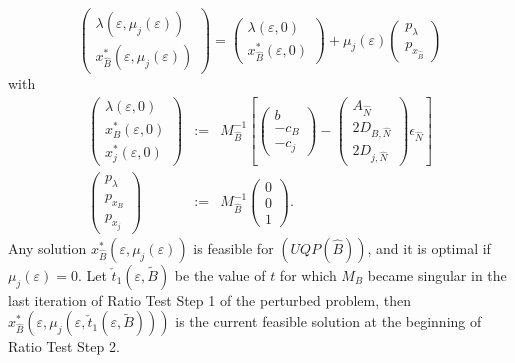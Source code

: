\documentclass[a4paper]{article}
\begin{document}
\begin{equation}
\label{eq:QP_j_mu_opt_short}
\left(\begin{array}{c}
         \lambda\left(\varepsilon, \mu_{j}\left(\varepsilon\right)\right) \\
	 \hline
	 x_{\hat{B}}^{*}\left(\varepsilon, 
	   \mu_{j}\left(\varepsilon\right)\right)
       \end{array}
\right)
=
\left(\begin{array}{c}
        \lambda\left(\varepsilon, 0\right) \\
	\hline
	x_{\hat{B}}^{*}\left(\varepsilon, 0\right)
       \end{array}
\right)
+ \mu_{j}(\varepsilon)
\left(\begin{array}{c}
         p_{\lambda} \\
	 \hline
	 p_{x_{\hat{B}}}
       \end{array}
\right)
\end{equation}
with
\begin{eqnarray}
\label{def:sol_eps_zero_II}
\left(\begin{array}{c}
         \lambda\left(\varepsilon, 0\right) \\
	 \hline
	 x_{B}^{*}\left(\varepsilon, 0\right) \\
	 \hline
	 x_{j}^{*}\left(\varepsilon, 0\right)
       \end{array}
\right)
&:=&M_{\hat{B}}^{-1}
\left[
  \left(\begin{array}{c}
          b \\
	  \hline
	  -c_{B} \\
	  \hline
	  -c_{j}
	\end{array}
   \right)
   -
   \left(\begin{array}{c}
           A_{\hat{N}} \\
	   \hline
	   2D_{B, \hat{N}} \\
	   \hline
	   2D_{j, \hat{N}}
	 \end{array}
   \right)\epsilon_{\hat{N}}
\right]
\\
\left(\begin{array}{c}
        p_{\lambda} \\
	\hline
	p_{x_{B}} \\
	\hline
	p_{x_{j}}
       \end{array}
\right)
&:=&M_{\hat{B}}^{-1}
\left(\begin{array}{c}
        0  \\
	\hline
	0  \\
	\hline
	1
       \end{array}
\right).
\end{eqnarray}
Any solution
$x_{\hat{B}}^{*}\left(\varepsilon,\mu_{j}\left(\varepsilon\right)\right)$ is
feasible for $(UQP(\hat{B}))$, and it is optimal if
$\mu_{j}\left(\varepsilon\right)=0$.
Let $\check{t}_{1}(\varepsilon, \tilde{B})$ be the value of $t$
for which $M_{B}$ became singular in the last iteration of Ratio Test Step 1
of the perturbed problem, then
$x_{\hat{B}}^{*}(\varepsilon, 
\mu_{j}(\varepsilon, \check{t}_{1}(\varepsilon, \tilde{B})))$
is the current feasible solution at the beginning of Ratio Test Step 2. 
\end{document}
